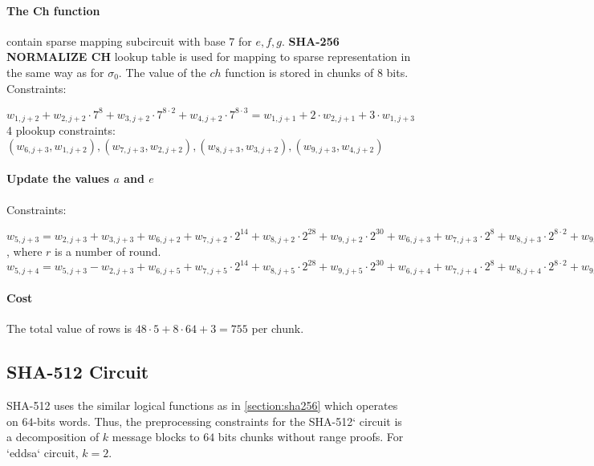 \paragraph{The Ch function}
contain sparse mapping subcircuit with base $7$ for $e, f ,g$.
\textbf{SHA-256 NORMALIZE CH} lookup table is used for mapping to sparse representation in the same way as for $\sigma_0$.
The value of the $ ch $ function is stored in chunks of $8$ bits.
Constraints:
\begin{center}
    $w_{1, j + 2} + w_{2, j + 2} \cdot 7^8 + w_{3, j + 2} \cdot 7^{8 \cdot 2} + w_{4, j + 2} \cdot 7^{8 \cdot 3} = w_{1, j + 1} + 2 \cdot w_{2, j + 1} + 3 \cdot w_{1, j + 3}$ \\
    4 plookup constraints: $( w_{6, j + 3}, w_{1, j + 2}), ( w_{7, j + 3}, w_{2, j + 2}), (w_{8, j + 3}, w_{3, j + 2}), (w_{9, j + 3}, w_{4, j + 2})$ \\
\end{center}

\paragraph{Update the values $a$ and $e$}
Constraints:
\begin{center}
    $w_{5, j + 3} = w_{2, j + 3} + w_{3, j + 3} + w_{6, j + 2} + w_{7, j + 2} \cdot 2^{14} + w_{8, j + 2} \cdot  2^{28} + w_{9, j + 2} \cdot 2^{30} + w_{6, j + 3} + w_{7, j + 3} \cdot 2^8 + w_{8, j + 3} \cdot 2^{8 \cdot 2} + w_{9, j + 3} \cdot 2^{8 \cdot 3} + k[r] + w_{4, j + 3}$, where $r$ is a number of round. \\
    $w_{5, j + 4} = w_{5, j + 3} - w_{2, j + 3} + w_{6, j + 5} + w_{7, j + 5} \cdot 2^{14} + w_{8, j + 5} \cdot  2^{28} + w_{9, j + 5} \cdot 2^{30} + w_{6, j + 4} + w_{7, j + 4} \cdot 2^8 + w_{8, j + 4} \cdot 2^{8 \cdot 2} + w_{9, j + 4} \cdot 2^{8 \cdot 3}$
\end{center}

\paragraph{Cost}
The total value of rows is $48 \cdot 5 + 8 \cdot 64 + 3 = 755$ per chunk.

\subsection{SHA-512 Circuit}
\label{section:sha512}
SHA-512 uses the similar logical functions as in \ref{section:sha256} which operates on $64$-bits words.
Thus, the preprocessing constraints for the SHA-512` circuit is a decomposition of $k$ message blocks to $64$ bits chunks without range proofs. For `eddsa` circuit, $k = 2$.

